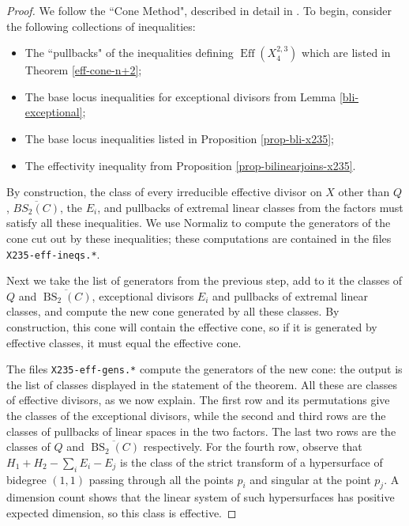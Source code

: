 \documentclass[a4paper,11pt]{article}
\newcommand{\Eff}{\operatorname{Eff}}
\newcommand{\BS}{\operatorname{BS}}
\begin{document}
\begin{proof} 
We follow the ``Cone Method", described in detail in \cite{GPP21}. To begin, consider the following collections of inequalities:
\begin{itemize}
    \item The ``pullbacks" of the inequalities defining $\Eff(X^{2,3}_4)$ which are listed in Theorem \ref{eff-cone-n+2};
    \item The base locus inequalities for exceptional divisors from Lemma \ref{bli-exceptional};
    \item The base locus inequalities listed in Proposition \ref{prop-bli-x235};
    \item The effectivity inequality from Proposition \ref{prop-bilinearjoins-x235}.
\end{itemize}
By construction, the class of every irreducible effective divisor on $X$ other than $Q$, $\overline{BS_2(C)}$, the $E_i$, and pullbacks of extremal linear classes from the factors must satisfy all these inequalities. We use Normaliz to compute the generators of the cone cut out by these inequalities; these computations are contained in the files {\tt X235-eff-ineqs.*}.

Next we take the list of generators from the previous step, add to it the classes of $Q$ and $\overline{\BS_2(C)}$, exceptional divisors $E_i$ and pullbacks of extremal linear classes, and compute the new cone generated by all these classes. By construction, this cone will contain the effective cone, so if it is generated by effective classes, it must equal the effective cone. 

The files {\tt X235-eff-gens.*} compute the generators of the new cone: the output is the list of classes displayed in the statement of the theorem. All these are classes of effective divisors, as we now explain. The first row and its permutations give the classes of the exceptional divisors, while the second and third rows are the classes of pullbacks of linear spaces in the two factors. The last two rows are the classes of  $Q$ and $\overline{\BS_2(C)}$ respectively. For the fourth row, observe that $H_1+H_2-\sum_iE_i -E_j$ is the class of the strict transform of a hypersurface of bidegree $(1,1)$ passing through all the points $p_i$ and singular at the point $p_j$. A dimension count shows that the linear system of such hypersurfaces has positive expected dimension, so this class is effective.
\end{proof}
\end{document}
